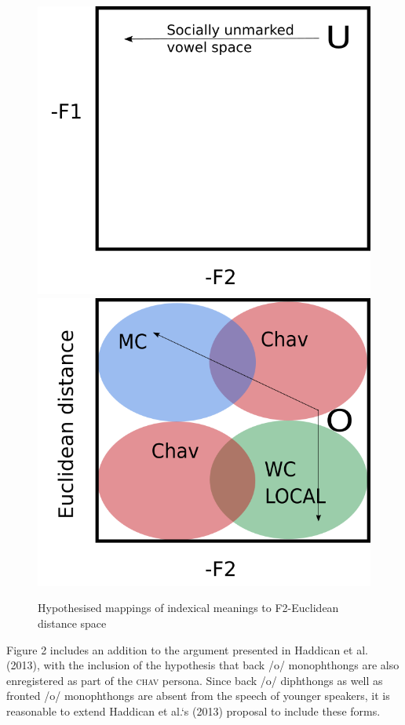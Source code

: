 \documentclass[PWPL]{article}
\begin{document}
\begin{figure}[ht]
\centering
\caption{Hypothesised mappings of indexical meanings to F2-Euclidean distance space}
\includegraphics[scale=0.2]{u_hypothesis_space.png}
\includegraphics[scale=0.2]{o_hypothesis_space.png}
\end{figure}

Figure 2 includes an addition to the argument presented in Haddican et al. (2013), with the inclusion of the hypothesis that back /o/ monophthongs are also enregistered as part of the \textsc{chav} persona. Since back /o/ diphthongs as well as fronted /o/ monophthongs are absent from the speech of younger speakers, it is reasonable to extend Haddican et al.`s (2013) proposal to include these forms. 
\end{document}
